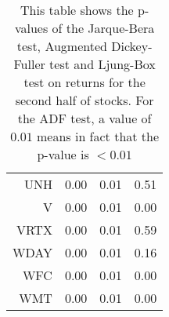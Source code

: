 \begin{table}[ht]
\begin{tabular}{rrrr}
  UNH & 0.00 & 0.01 & 0.51 \\ 
  V & 0.00 & 0.01 & 0.00 \\ 
  VRTX & 0.00 & 0.01 & 0.59 \\ 
  WDAY & 0.00 & 0.01 & 0.16 \\ 
  WFC & 0.00 & 0.01 & 0.00 \\ 
  WMT & 0.00 & 0.01 & 0.00 \\ 
   \hline
\end{tabular}
\caption[JB test, ADF test, LB text on returns. (2)]{This table shows the p-values of the Jarque-Bera test, Augmented Dickey-Fuller test and Ljung-Box test 
                     on returns for the second half of stocks. For the ADF test, a value of $0.01$ means in fact that the p-value is $<0.01$} 
\label{Table:Rets_p_vals_2}
\end{table}
